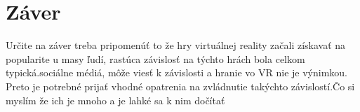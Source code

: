 \documentclass[10pt,oneside,slovak,a4paper]{article}
\begin{document}

\section{Záver} \label{zaver} %
Určite na záver treba pripomenúť to že  hry virtuálnej reality začali získavať na popularite u masy ľudí, rastúca závislosť na týchto hrách bola celkom typická.sociálne médiá, môže viesť k závislosti a hranie vo VR nie je výnimkou. Preto je potrebné prijať vhodné opatrenia na zvládnutie takýchto závislostí.Čo si myslím že ich je mnoho a je lahké sa k nim dočítať
\cite{8649547}






\end{document}
